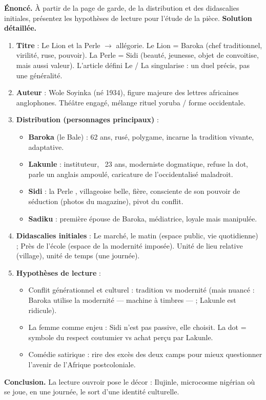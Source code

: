 \documentclass[11pt]{article}
\newcommand{\cle}[1]{{\popxbold\color{popdark}#1}}
\begin{document}
\begin{exoresolu}
\textbf{Énoncé.} À partir de la page de garde, de la distribution et des didascalies initiales, présentez les hypothèses de lecture pour l'étude de la pièce.
\tcblower
\textbf{Solution détaillée.}
\begin{enumerate}
\item \textbf{Titre} : \og Le Lion et la Perle \fg{} $\rightarrow$ allégorie. Le Lion = Baroka (chef traditionnel, virilité, ruse, pouvoir). La Perle = Sidi (beauté, jeunesse, objet de convoitise, mais aussi valeur). L'article défini \og Le \fg{} / \og La \fg{} singularise : un duel précis, pas une généralité.
\item \textbf{Auteur} : Wole Soyinka (né 1934), figure majeure des lettres africaines anglophones. Théâtre engagé, mélange rituel yoruba / forme occidentale.
\item \textbf{Distribution (personnages principaux)} :
\begin{itemize}
\item \textbf{Baroka} (le Bale) : 62 ans, rusé, polygame, incarne la tradition vivante, adaptative.
\item \textbf{Lakunle} : instituteur, ~23 ans, \cle{moderniste} dogmatique, refuse la dot, parle un anglais ampoulé, caricature de l'occidentalisé maladroit.
\item \textbf{Sidi} : la \og Perle \fg{}, villageoise belle, fière, consciente de son pouvoir de séduction (photos du magazine), pivot du conflit.
\item \textbf{Sadiku} : première épouse de Baroka, médiatrice, loyale mais manipulée.
\end{itemize}
\item \textbf{Didascalies initiales} : \og Le marché, le matin \fg{} (espace public, vie quotidienne) ; \og Près de l'école \fg{} (espace de la modernité imposée). Unité de lieu relative (village), unité de temps (une journée).
\item \textbf{Hypothèses de lecture} :
\begin{itemize}
\item Conflit générationnel et culturel : tradition vs modernité (mais nuancé : Baroka utilise la modernité — machine à timbres — ; Lakunle est ridicule).
\item La femme comme enjeu : Sidi n'est pas passive, elle choisit. La dot = symbole du respect coutumier vs achat perçu par Lakunle.
\item Comédie satirique : rire des excès des deux camps pour mieux questionner l'avenir de l'Afrique postcoloniale.
\end{itemize}
\end{enumerate}
\textbf{Conclusion.} La lecture ouvroir pose le décor : Ilujinle, microcosme nigérian où se joue, en une journée, le sort d'une identité culturelle.
\end{exoresolu}
\end{document}
